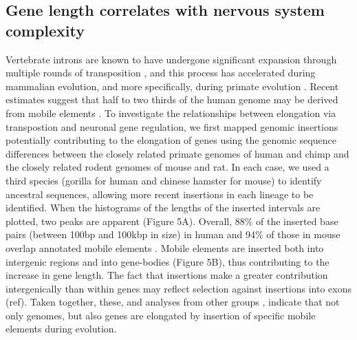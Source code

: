 \subsection{Gene length correlates with nervous system complexity}
Vertebrate introns are known to have undergone significant expansion through multiple rounds of transposition \cite{Grishkevich_2014}, and this process has accelerated during mammalian evolution, and more specifically, during primate evolution \cite{Friedli_2015}. Recent estimates suggest that half to two thirds of the human genome may be derived from mobile elements \cite{Friedli_2015}. %
To investigate the relationships between elongation via transpostion and neuronal gene regulation, we first mapped genomic insertions potentially contributing to the elongation of genes using the genomic sequence differences between the closely related primate genomes of human and chimp and the closely related rodent genomes of mouse and rat. In each case, we used a third species (gorilla for human and chinese hamster for mouse) to identify ancestral sequences, allowing more recent insertions in each lineage to be identified. When the histograms of the lengths of the inserted intervals are plotted, two peaks are apparent (Figure 5A). 
Overall, 88\% of the inserted base pairs (between 100bp and 100kbp in size) in human and 94\% of those in mouse overlap annotated mobile elements \cite{Hubley_2015}. Mobile elements are inserted both into intergenic regions and into gene-bodies (Figure 5B), thus contributing to the increase in gene length. The fact that insertions make a greater contribution intergenically than within genes may reflect selection against insertions into exons (ref). Taken together, these, and analyses from other groups \citep{Grishkevich_2014,Chimpanzee_2005}, indicate that not only genomes, but also genes are elongated by insertion of specific mobile elements during evolution.


